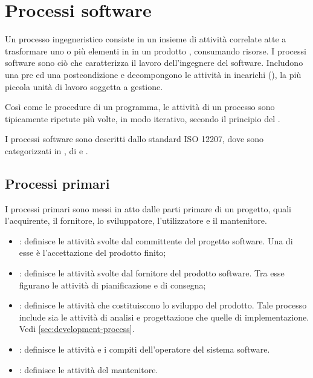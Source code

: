 \section{Processi software}

Un \gls{processo} ingegneristico consiste in un insieme di attività correlate
atte a trasformare uno o più elementi in  in un prodotto
, consumando risorse. I processi software sono ciò che
caratterizza il lavoro dell'ingegnere del software. Includono una pre ed una
postcondizione e decompongono le attività in incarichi (), la più
piccola unità di lavoro soggetta a gestione.

Così come le procedure di un programma, le attività di un processo sono
tipicamente ripetute più volte, in modo iterativo, secondo il principio del
.


I processi software sono descritti dallo standard ISO 12207, dove sono
categorizzati in , di  e
.

\subsection{Processi primari}

I processi primari sono messi in atto dalle parti primare di un progetto, quali
l'acquirente, il fornitore, lo sviluppatore, l'utilizzatore e il mantenitore.

\begin{itemize}
  \item {}: definisce le attività svolte dal committente
    del progetto software. Una di esse è l'accettazione del prodotto finito;
  \item {}: definisce le attività svolte dal fornitore del
    prodotto software. Tra esse figurano le attività di pianificazione e di
    consegna;
  \item {}: definisce le attività che costituiscono lo sviluppo
    del prodotto. Tale processo include sia le attività di analisi e
    progettazione che quelle di implementazione. Vedi
    \ref{sec:development-process}.
  \item {}: definisce le attività e i
    compiti dell'operatore del sistema software.
  \item {}: definisce le attività del mantenitore.
\end{itemize}

